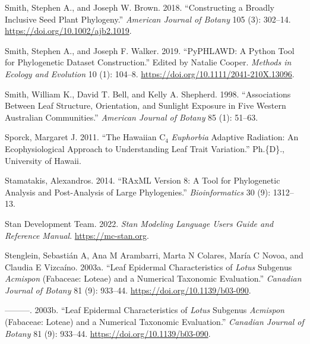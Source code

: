 \documentclass[
  12pt,
]{article}
\newlength{\cslhangindent}
\newlength{\cslentryspacingunit} %
\newenvironment{CSLReferences}[2] %
 {%
  \setlength{\parindent}{0pt}
  \ifodd #1
  \let\oldpar\par
  \def\par{\hangindent=\cslhangindent\oldpar}
  \fi
  \setlength{\parskip}{#2\cslentryspacingunit}
 }%
 {}
\begin{document}
\begin{CSLReferences}{1}{0}
\leavevmode{}%
Smith, Stephen A., and Joseph W. Brown. 2018. {``Constructing a Broadly Inclusive Seed Plant Phylogeny.''} \emph{American Journal of Botany} 105 (3): 302--14. \url{https://doi.org/10.1002/ajb2.1019}.

\leavevmode{}%
Smith, Stephen A., and Joseph F. Walker. 2019. {``{PyPHLAWD}: {A} Python Tool for Phylogenetic Dataset Construction.''} Edited by Natalie Cooper. \emph{Methods in Ecology and Evolution} 10 (1): 104--8. \url{https://doi.org/10.1111/2041-210X.13096}.

\leavevmode{}%
Smith, William K., David T. Bell, and Kelly A. Shepherd. 1998. {``Associations Between Leaf Structure, Orientation, and Sunlight Exposure in Five {Western} {Australian} Communities.''} \emph{American Journal of Botany} 85 (1): 51--63.

\leavevmode{}%
Sporck, Margaret J. 2011. {``The {Hawaiian} {C}\(_{\textrm{4}}\) \emph{Euphorbia} Adaptive Radiation: An Ecophysiological Approach to Understanding Leaf Trait Variation.''} Ph.\{D\}., University of Hawaii.

\leavevmode{}%
Stamatakis, Alexandros. 2014. {``{RAxML} Version 8: A Tool for Phylogenetic Analysis and Post-Analysis of Large Phylogenies.''} \emph{Bioinformatics} 30 (9): 1312--13.

\leavevmode{}%
Stan Development Team. 2022. \emph{Stan {Modeling} {Language} {Users} {Guide} and {Reference} {Manual}}. \url{https://mc-stan.org}.

\leavevmode{}%
Stenglein, Sebastián A, Ana M Arambarri, Marta N Colares, María C Novoa, and Claudia E Vizcaíno. 2003a. {``Leaf Epidermal Characteristics of \emph{Lotus} Subgenus \emph{Acmispon} ({Fabaceae}: {Loteae}) and a Numerical Taxonomic Evaluation.''} \emph{Canadian Journal of Botany} 81 (9): 933--44. \url{https://doi.org/10.1139/b03-090}.

\leavevmode{}%
---------. 2003b. {``Leaf Epidermal Characteristics of \emph{Lotus} Subgenus \emph{Acmispon} ({Fabaceae}: {Loteae}) and a Numerical Taxonomic Evaluation.''} \emph{Canadian Journal of Botany} 81 (9): 933--44. \url{https://doi.org/10.1139/b03-090}.


\end{CSLReferences}
\end{document}
